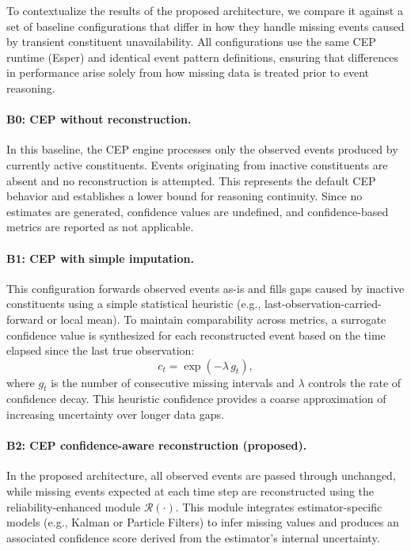 To contextualize the results of the proposed architecture, we compare it against a set of baseline configurations that differ in how they handle missing events caused by transient constituent unavailability. All configurations use the same CEP runtime (Esper) and identical event pattern definitions, ensuring that differences in performance arise solely from how missing data is treated prior to event reasoning.

\paragraph{B0: CEP without reconstruction.}
In this baseline, the CEP engine processes only the observed events produced by currently active constituents. 
Events originating from inactive constituents are absent and no reconstruction is attempted. 
This represents the default CEP behavior and establishes a lower bound for reasoning continuity.
Since no estimates are generated, confidence values are undefined, and confidence-based metrics are reported as not applicable.

\paragraph{B1: CEP with simple imputation.}
This configuration forwards observed events as-is and fills gaps caused by inactive constituents using a simple statistical heuristic (e.g., last-observation-carried-forward or local mean). 
To maintain comparability across metrics, a surrogate confidence value is synthesized for each reconstructed event based on the time elapsed since the last true observation:
\[
c_t = \exp(-\lambda \, g_t),
\]
where $g_t$ is the number of consecutive missing intervals and $\lambda$ controls the rate of confidence decay. 
This heuristic confidence provides a coarse approximation of increasing uncertainty over longer data gaps.

\paragraph{B2: CEP confidence-aware reconstruction (proposed).}
In the proposed architecture, all observed events are passed through unchanged, while missing events expected at each time step are reconstructed using the reliability-enhanced module $\mathcal{R}(\cdot)$. 
This module integrates estimator-specific models (e.g., Kalman or Particle Filters) to infer missing values and produces an associated confidence score derived from the estimator’s internal uncertainty.

